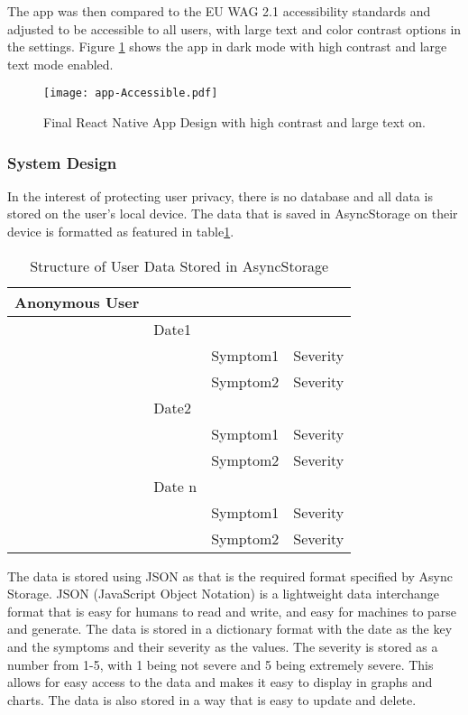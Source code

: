 The app was then compared to the EU WAG 2.1 accessibility standards and adjusted to be accessible to all users, with large text and color contrast options in the settings. Figure \ref{figure:app-Accessible} shows the app in dark mode with high contrast and large text mode enabled.
\begin{figure}[h!!]
  \begin{center}
    \texttt{[image: app-Accessible.pdf]}
    \caption{Final React Native App Design with high contrast and large text on.}
    \label{figure:app-Accessible}
  \end{center}
\end{figure}

\subsubsection{System Design}
In the interest of protecting user privacy, there is no database and all data is stored on the user's local device. The data that is saved in AsyncStorage on their device is formatted as featured in table\ref{table:user-data}. 
\begin{table}[h!!]
    \caption{Structure of User Data Stored in AsyncStorage}
    \label{table:user-data}
    \begin{tabular}{llll}
    \hline
    Anonymous User &        &          &          \\ \hline
                  & Date1  &          &          \\
                  &        & Symptom1 & Severity \\
                  &        & Symptom2 & Severity \\
                  & Date2  &          &          \\
                  &        & Symptom1 & Severity \\
                  &        & Symptom2 & Severity \\
                  & Date n &          &          \\
                  &        & Symptom1 & Severity \\
                  &        & Symptom2 & Severity \\ \hline
  \end{tabular}
\end{table}

The data is stored using JSON as that is the required format specified by Async Storage. JSON (JavaScript Object Notation) is a lightweight data interchange format that is easy for humans to read and write, and easy for machines to parse and generate\cite{JSON2025}. The data is stored in a dictionary format with the date as the key and the symptoms and their severity as the values. The severity is stored as a number from 1-5, with 1 being not severe and 5 being extremely severe. This allows for easy access to the data and makes it easy to display in graphs and charts. The data is also stored in a way that is easy to update and delete.

